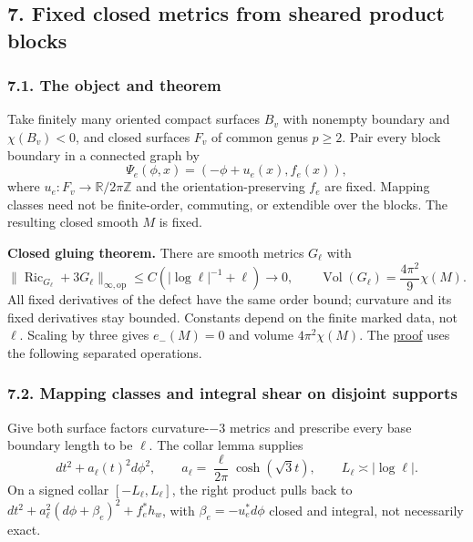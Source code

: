 \documentclass[
  english,
]{article}
\begin{document}
\hypertarget{fixed-closed-metrics-from-sheared-product-blocks}{%
\subsection{7. Fixed closed metrics from sheared product
blocks}\label{fixed-closed-metrics-from-sheared-product-blocks}}

\hypertarget{the-object-and-theorem}{%
\subsubsection{7.1. The object and
theorem}\label{the-object-and-theorem}}

Take finitely many oriented compact surfaces \(B_v\) with nonempty
boundary and \(\chi(B_v)<0\), and closed surfaces \(F_v\) of common
genus \(p\ge2\). Pair every block boundary in a connected graph by \[
\Psi_e(\phi,x)=(-\phi+u_e(x),f_e(x)),
\tag{7.1}
\] where \(u_e:F_v\to\mathbb R/2\pi\mathbb Z\) and the
orientation-preserving \(f_e\) are fixed. Mapping classes need not be
finite-order, commuting, or extendible over the blocks. The resulting
closed smooth \(M\) is fixed.

\textbf{Closed gluing theorem.} There are smooth metrics \(G_\ell\) with
\[
\|\operatorname{Ric}_{G_\ell}+3G_\ell\|_{\infty,\mathrm{op}}
\le C(|\log\ell|^{-1}+\ell)\to0,\qquad
\operatorname{Vol}(G_\ell)=\frac{4\pi^2}{9}\chi(M).
\tag{7.2}
\] All fixed derivatives of the defect have the same order bound;
curvature and its fixed derivatives stay bounded. Constants depend on
the finite marked data, not \(\ell\). Scaling by three gives
\(e_-(M)=0\) and volume \(4\pi^2\chi(M)\). The
\href{../proofs/round11_closed_gluing.md}{proof} uses the following
separated operations.

\hypertarget{mapping-classes-and-integral-shear-on-disjoint-supports}{%
\subsubsection{7.2. Mapping classes and integral shear on disjoint
supports}\label{mapping-classes-and-integral-shear-on-disjoint-supports}}

Give both surface factors curvature-\(-3\) metrics and prescribe every
base boundary length to be \(\ell\). The collar lemma supplies \[
dt^2+a_\ell(t)^2d\phi^2,\qquad
a_\ell=\frac{\ell}{2\pi}\cosh(\sqrt3t),\qquad L_\ell\asymp|\log\ell|.
\] On a signed collar \([-L_\ell,L_\ell]\), the right product pulls back
to \(dt^2+a_\ell^2(d\phi+\beta_e)^2+f_e^*h_w\), with
\(\beta_e=-u_e^*d\phi\) closed and integral, not necessarily exact.
\end{document}
